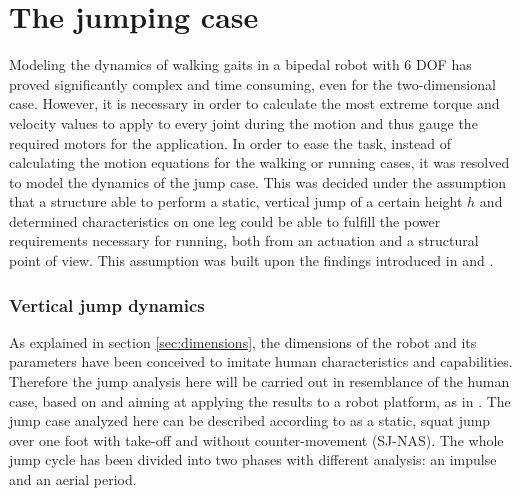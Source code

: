 
\section{The jumping case} %
\label{sec:jumping_case}
Modeling the dynamics of walking gaits in a bipedal robot with 6 DOF has proved significantly complex and time consuming, even for the two-dimensional case.
However, it is necessary in order to calculate the most extreme torque and velocity values to apply to every joint during the motion and thus gauge the required motors for the application.
In order to ease the task, instead of calculating the motion equations for the walking or running cases, it was resolved to model the dynamics of the jump case.
This was decided under the assumption that a structure able to perform a static, vertical jump of a certain height $h$ and determined characteristics on one leg could be able to fulfill the power requirements necessary for running, both from an actuation and a structural point of view.
This assumption was built upon the findings introduced in \cite{jump-run1} and \cite{jump-run2}.

\subsubsection{Vertical jump dynamics} %
\label{ssub:static_jumping_dynamics}
As explained in section \ref{sec:dimensions}, the dimensions of the robot and its parameters have been conceived to imitate human characteristics and capabilities.
Therefore the jump analysis here will be carried out in resemblance of the human case, based on \cite{jump-dynamics1} and aiming at applying the results to a robot platform, as in \cite{jump-dynamics2}.
The jump case analyzed here can be described according to \cite{jump-dynamics1} as a static, squat jump over one foot with take-off and without counter-movement (SJ-NAS).
The whole jump cycle has been divided into two phases with different analysis: an impulse and an aerial period.

